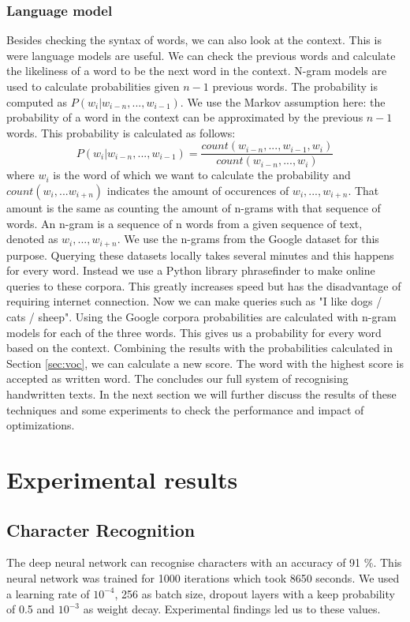 \documentclass{article}
\begin{document}
\subsubsection{Language model}
\label{sec:lm}
Besides checking the syntax of words, we can also look at the context. This is were language models are useful. We can check the previous words and calculate the likeliness of a word to be the next word in the context. N-gram models are used to calculate probabilities given $n-1$ previous words. The probability is computed as $P(w_i | w_{i-n},...,w_{i-1})$. 
We use the Markov assumption here: the probability of a word in the context can be approximated by the previous $n-1$ words. \cite{markov} This probability is calculated as follows: 
\begin{equation}
        P(w_i | w_{i-n},...,w_{i-1}) = \frac{count(w_{i-n},...,w_{i-1},w_{i})}{count(w_{i-n},...,w_i)}
\end{equation}
where $w_i$ is the word of which we want to calculate the probability and $count(w_i,...w_{i+n})$ indicates the amount of occurences of $w_i,...,w_{i+n}$. That amount is the same as counting the amount of n-grams with that sequence of words. An n-gram is a sequence of n words from a given sequence of text, denoted as $w_i,...,w_{i+n}$. \cite{ngrams} 
We use the n-grams from the Google dataset for this purpose. \cite{google} Querying these datasets locally takes several minutes and this happens for every word. Instead we use a Python library phrasefinder to make online queries to these corpora. This greatly increases speed but has the disadvantage of requiring internet connection. 
Now we can make queries such as "I like dogs / cats / sheep". Using the Google corpora probabilities are calculated with n-gram models for each of the three words. This gives us a probability for every word based on the context. 
Combining the results with the probabilities calculated in Section \ref{sec:voc}, we can 
calculate a new score. The word with the highest score is accepted as written word. 
The concludes our full system of recognising handwritten texts. In the next section we will further discuss the results of these techniques and some experiments to check the performance and impact of optimizations. 
\section{Experimental results}
\subsection{Character Recognition}
The deep neural network can recognise characters with an accuracy of 91 \%. This neural network was trained for 1000 iterations which took 8650 seconds. We used a learning rate of $10^{-4}$, 256 as batch size, dropout layers with a keep probability of 0.5 and $10^{-3}$ as weight decay. Experimental findings led us to these values. 
\end{document}
